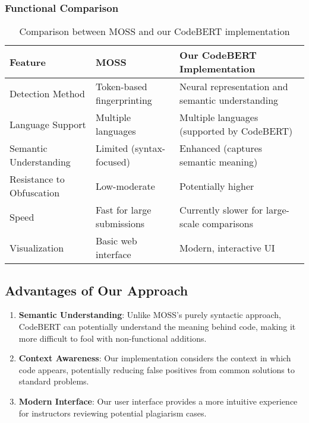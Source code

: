 \documentclass[12pt, titlepage]{article}
\begin{document}
\subsubsection{Functional Comparison}

\begin{table}[h]
\centering
\begin{tabular}{|p{3cm}|p{5cm}|p{5cm}|}
\hline
\textbf{Feature} & \textbf{MOSS} & \textbf{Our CodeBERT Implementation} \\
\hline
Detection Method & Token-based fingerprinting & Neural representation and semantic understanding \\
\hline
Language Support & Multiple languages & Multiple languages (supported by CodeBERT) \\
\hline
Semantic Understanding & Limited (syntax-focused) & Enhanced (captures semantic meaning) \\
\hline
Resistance to Obfuscation & Low-moderate & Potentially higher \\
\hline
Speed & Fast for large submissions & Currently slower for large-scale comparisons \\
\hline
Visualization & Basic web interface & Modern, interactive UI \\
\hline
\end{tabular}
\caption{Comparison between MOSS and our CodeBERT implementation}
\label{tab:comparison}
\end{table}

\subsection{Advantages of Our Approach}

\begin{enumerate}
    \item \textbf{Semantic Understanding}: Unlike MOSS's purely syntactic approach, CodeBERT can potentially understand the meaning behind code, making it more difficult to fool with non-functional additions.

    \item \textbf{Context Awareness}: Our implementation considers the context in which code appears, potentially reducing false positives from common solutions to standard problems.

    \item \textbf{Modern Interface}: Our user interface provides a more intuitive experience for instructors reviewing potential plagiarism cases.
\end{enumerate}
\end{document}
